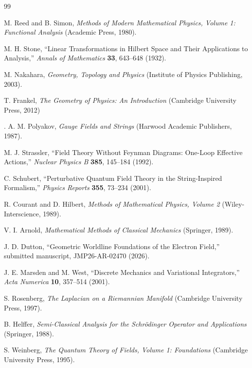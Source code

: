 \documentclass[aip,jmp,reprint,onecolumn,nofootinbib]{revtex4-2}
\begin{document}
\begin{thebibliography}{99}

  M. Reed and B. Simon, \textit{Methods of Modern Mathematical Physics, Volume 1: Functional Analysis} (Academic Press, 1980).

  M. H. Stone, ``Linear Transformations in Hilbert Space and Their Applications to Analysis,'' \textit{Annals of Mathematics} \textbf{33}, 643--648 (1932). 

 M. Nakahara, \textit{Geometry, Topology and Physics} (Institute of Physics Publishing, 2003).

  T. Frankel, \textit{The Geometry of Physics: An Introduction} (Cambridge University Press, 2012)

.  A. M. Polyakov, \textit{Gauge Fields and Strings} (Harwood Academic Publishers, 1987).

  M. J. Strassler, ``Field Theory Without Feynman Diagrams: One-Loop Effective Actions,'' \textit{Nuclear Physics B} \textbf{385}, 145--184 (1992). 

 C. Schubert, ``Perturbative Quantum Field Theory in the String-Inspired Formalism,'' \textit{Physics Reports} \textbf{355}, 73--234 (2001).

  R. Courant and D. Hilbert, \textit{Methods of Mathematical Physics, Volume 2} (Wiley-Interscience, 1989).

  V. I. Arnold, \textit{Mathematical Methods of Classical Mechanics} (Springer, 1989).

  J. D. Dutton, ``Geometric Worldline Foundations of the Electron Field,'' submitted manuscript, JMP26-AR-02470 (2026).

  J. E. Marsden and M. West, ``Discrete Mechanics and Variational Integrators,'' \textit{Acta Numerica} \textbf{10}, 357--514 (2001).

  S. Rosenberg, \textit{The Laplacian on a Riemannian Manifold} (Cambridge University Press, 1997).

  B. Helffer, \textit{Semi-Classical Analysis for the Schrödinger Operator and Applications} (Springer, 1988).

  S. Weinberg, \textit{The Quantum Theory of Fields, Volume 1: Foundations} (Cambridge University Press, 1995).


\end{thebibliography}
\end{document}
